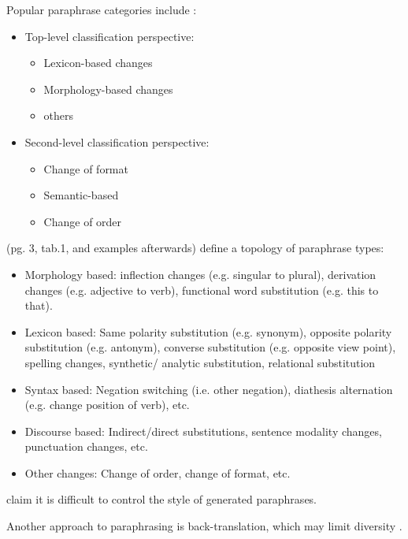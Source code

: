 Popular paraphrase categories include \citep{fu_learning_2024}:
\begin{itemize}
    \item Top-level classification perspective: 
        \begin{itemize}
            \item Lexicon-based changes
            \item Morphology-based changes
            \item others
        \end{itemize}
    \item Second-level classification perspective:
        \begin{itemize}
            \item Change of format
            \item Semantic-based
            \item Change of order
        \end{itemize}
\end{itemize}

\citet{zhou_paraphrase_2025} (pg. 3, tab.1, and examples afterwards) define a topology of paraphrase types:
\begin{itemize}
    \item Morphology based: inflection changes (e.g. singular to plural), derivation changes (e.g. adjective to verb), functional word substitution (e.g. this to that).
    \item Lexicon based: Same polarity substitution (e.g. synonym), opposite polarity substitution (e.g. antonym), converse substitution (e.g. opposite view point), spelling changes, synthetic/ analytic substitution, relational substitution
    \item Syntax based: Negation switching (i.e. other negation), diathesis alternation (e.g. change position of verb), etc.
    \item Discourse based: Indirect/direct substitutions, sentence modality changes, punctuation changes, etc.
    \item Other changes: Change of order, change of format, etc.
\end{itemize}

\citet{zhou_paraphrase_2021} claim it is difficult to control the style of generated paraphrases.

Another approach to paraphrasing is back-translation, which may limit diversity \citep{zhou_paraphrase_2025}.
